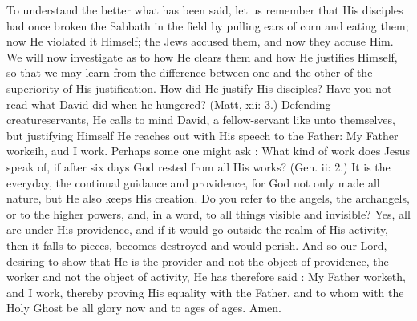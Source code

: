 To understand the better what has been said, 
let us remember that His disciples had once 
broken the Sabbath in the field by pulling ears 
of corn and eating them; now He violated it 
Himself; the Jews accused them, and now they 
accuse Him. We will now investigate as to how 
He clears them and how He justifies Himself, so 
that we may learn from the difference between 
one and the other of the superiority of His 
justification. How did He justify His disciples? 
Have you not read what David did when he 
hungered? (Matt, xii: 3.) Defending creatureservants,
He calls to mind David, a fellow-servant
like unto themselves, but justifying Himself 
He reaches out with His speech to the Father: 
My Father workeih, aud I work. Perhaps some 
one might ask : What kind of work does Jesus 
speak of, if after six days God rested from all 
His works? (Gen. ii: 2.) It is the everyday, the 
continual guidance and providence, for God not 
only made all nature, but He also keeps His 
creation. Do you refer to the angels, the archangels,
or to the higher powers, and, in a word, 
to all things visible and invisible? Yes, all are 
under His providence, and if it would go outside 
the realm of His activity, then it falls to pieces, 
becomes destroyed and would perish. And so 
our Lord, desiring to show that He is the provider
and not the object of providence, the 
worker and not the object of activity, He has 
therefore said : My Father worketh, and I work, 
thereby proving His equality with the Father, 
and to whom with the Holy Ghost be all glory 
now and to ages of ages. Amen.

